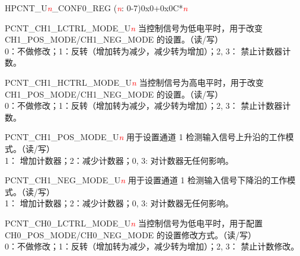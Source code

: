 \begin{register}{H}{PCNT\_U\textit{\textcolor{red}{\it{n}}}\_CONF0\_REG (\textit{\textcolor{red}{\it{n}}}: 0-7)}{0x0+0x0C*\textit{\textcolor{red}{\it{n}}}}\label{regdesc:PCNTUnCONF0REG}
%
%
%
%
%
%
%
%
%
%
%
%
%
%
%
\regnewline%
\begin{regdesc}\begin{reglist}
\item [PCNT\_CH1\_LCTRL\_MODE\_U\textcolor{red}{\it{n}}] 当控制信号为低电平时，用于改变 CH1\_POS\_MODE/CH1\_NEG\_MODE 的设置。（读/写）\\0：不做修改；1：反转（增加转为减少，减少转为增加）；2, 3： 禁止计数器计数。
\item [PCNT\_CH1\_HCTRL\_MODE\_U\textcolor{red}{\it{n}}] 当控制信号为高电平时，用于改变 CH1\_POS\_MODE/CH1\_NEG\_MODE 的设置。（读/写） \\0：不做修改；1：反转（增加转为减少，减少转为增加）；2, 3： 禁止计数器计数。
\item [PCNT\_CH1\_POS\_MODE\_U\textcolor{red}{\it{n}}] 用于设置通道 1 检测输入信号上升沿的工作模式。（读/写） \\1： 增加计数器；2：减少计数器；0, 3: 对计数器无任何影响。
\item [PCNT\_CH1\_NEG\_MODE\_U\textcolor{red}{\it{n}}] 用于设置通道 1 检测输入信号下降沿的工作模式。（读/写）\\1： 增加计数器；2：减少计数器；0, 3: 对计数器无任何影响。
\item [PCNT\_CH0\_LCTRL\_MODE\_U\textcolor{red}{\it{n}}] 当控制信号为低电平时，用于配置 CH0\_POS\_MODE/CH0\_NEG\_MODE 的设置修改方式。（读/写） \\0：不做修改；1：反转（增加转为减少，减少转为增加）；2, 3： 禁止计数修改。

\end{reglist}
\end{regdesc}
\end{register}
